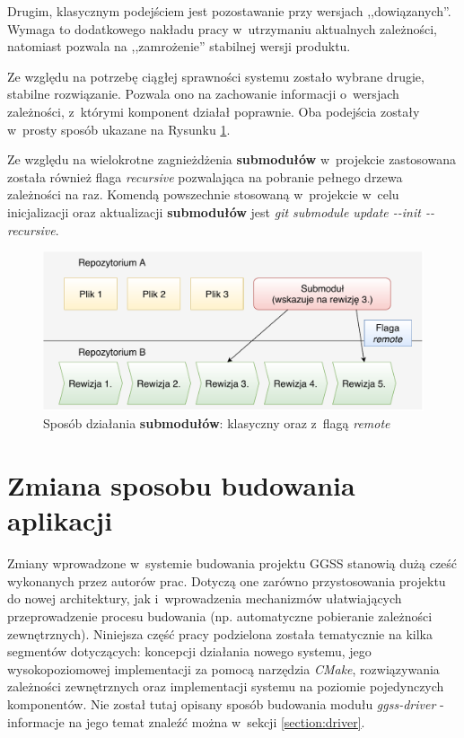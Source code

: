 Drugim, klasycznym podejściem jest pozostawanie przy wersjach ,,dowiązanych''. Wymaga to dodatkowego nakładu pracy w~utrzymaniu aktualnych zależności, natomiast pozwala na ,,zamrożenie'' stabilnej wersji produktu.

Ze względu na potrzebę ciągłej sprawności systemu zostało wybrane drugie, stabilne rozwiązanie. Pozwala ono na zachowanie informacji o~wersjach zależności, z~którymi komponent działał poprawnie. Oba podejścia zostały w~prosty sposób ukazane na Rysunku \ref{fig:subRem}.

Ze względu na wielokrotne zagnieżdżenia \textbf{submodułów} w~projekcie zastosowana została również flaga \textit{recursive} pozwalająca na pobranie pełnego drzewa zależności na raz. Komendą powszechnie stosowaną w~projekcie w~celu inicjalizacji oraz aktualizacji \textbf{submodułów} jest \textit{git submodule update -{}-init -{}-recursive}.

\begin{figure}[H]
\centering
\includegraphics[width=\textwidth]{res/submoduleRemote}
\caption{Sposób działania \textbf{submodułów}: klasyczny oraz z~flagą \textit{remote}}
\label{fig:subRem}
\end{figure}



\newpage

\section{Zmiana sposobu budowania aplikacji}
Zmiany wprowadzone w~systemie budowania projektu GGSS stanowią dużą cześć wykonanych przez autorów prac. Dotyczą one zarówno przystosowania projektu do nowej architektury, jak i~wprowadzenia mechanizmów ułatwiających przeprowadzenie procesu budowania (np. automatyczne pobieranie zależności zewnętrznych). Niniejsza część pracy podzielona została tematycznie na kilka segmentów dotyczących: koncepcji działania nowego systemu, jego wysokopoziomowej implementacji za pomocą narzędzia \textit{CMake}, rozwiązywania zależności zewnętrznych oraz implementacji systemu na poziomie pojedynczych komponentów. Nie został tutaj opisany sposób budowania modułu \textit{ggss-driver} - informacje na jego temat znaleźć można w~sekcji \ref{section:driver}.

